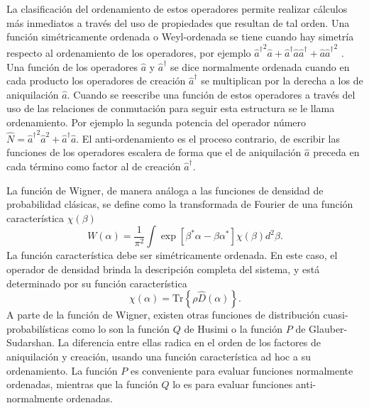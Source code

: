 La clasificación del ordenamiento de estos operadores permite realizar cálculos más inmediatos a través del uso de propiedades que resultan de tal orden. Una función simétricamente ordenada o Weyl-ordenada se tiene cuando hay simetría respecto al ordenamiento de los operadores, por ejemplo ${\hat{a}^\dagger}^2 \hat{a} + \hat{a}^\dagger \hat{a}\hat{a}^\dagger + \hat{a} {\hat{a}^\dagger}^2 $ \cite{Mandel}. Una función de los operadores $\hat{a}$ y $\hat{a}^\dagger$ se dice normalmente ordenada cuando en cada producto los operadores de creación $\hat{a}^\dagger$ se multiplican por la derecha a los de aniquilación $\hat{a}$. Cuando se reescribe una función de estos operadores a través del uso de las relaciones de conmutación para seguir esta estructura se le llama ordenamiento. Por ejemplo la segunda potencia del operador número $\hat{N}={\hat{a}^\dagger}^2 \hat{a}^2 + \hat{a}^\dagger \hat{a}$. El anti-ordenamiento es el proceso contrario, de escribir las funciones de los operadores escalera de forma que el de aniquilación $\hat{a}$ preceda en cada término como factor al de creación $\hat{a}^\dagger$.

La función de Wigner, de manera análoga a las funciones de densidad de probabilidad clásicas, se define como la transformada de Fourier de una función característica $\chi(\beta)$
\begin{equation}
  W(\alpha) = \frac{1}{\pi^2}\int \exp{\left[ \beta^* \alpha - \beta \alpha^* \right]} \chi(\beta) d^2\beta.
\end{equation}
La función característica debe ser simétricamente ordenada. En este caso, el operador de densidad brinda la descripción completa del sistema, y está determinado por su función característica
\begin{equation}
  \chi(\alpha) = \text{Tr}\left\{ \rho \hat{D}(\alpha)  \right\}.
\end{equation}
A parte de la función de Wigner, existen otras funciones de distribución cuasi-probabilísticas como lo son la función $Q$ de Husimi o la función $P$ de Glauber-Sudarshan. La diferencia entre ellas radica en el orden de los factores de aniquilación y creación, usando una función característica ad hoc a su  ordenamiento. La función $P$ es conveniente para evaluar funciones normalmente ordenadas, mientras que la función $Q$ lo es para evaluar funciones anti-normalmente ordenadas.

